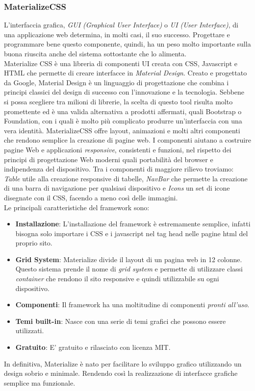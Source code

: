 \subsubsection{MaterializeCSS}
\label{sec:materialCSS}
L'interfaccia grafica, \textit{GUI (Graphical User Interface)} o \textit{UI (User Interface)}, di una applicazione web determina, in molti casi, il suo successo. Progettare e programmare bene questo componente, quindi, ha un peso molto importante sulla buona riuscita anche del sistema sottostante che lo alimenta. 
\\Materialize CSS è una libreria di componenti UI creata con CSS, Javascript e HTML che permette di creare interfacce in \textit{Material Design}. Creato e progettato da Google, Material Design è un linguaggio di progettazione che combina i principi classici del design di successo con l'innovazione e la tecnologia. Sebbene si possa scegliere tra milioni di librerie, la scelta di questo tool risulta molto promettente ed è una valida alternativa a prodotti affermati, quali Bootstrap o Foundation, con i quali è molto più complicato produrre un'interfaccia con una vera identità. MaterializeCSS offre layout, animazioni e molti altri componenti che rendono semplice la creazione di pagine web. I componenti aiutano a costruire pagine Web e applicazioni \textit{responsive}, consistenti e funzioni, nel rispetto dei principi di progettazione Web moderni quali portabilità del browser e indipendenza del dispositivo. Tra i componenti di maggiore rilievo troviamo: \textit{Table} utile alla creazione responsive di tabelle, \textit{NavBar} che permette la creazione di una barra di navigazione per qualsiasi dispositivo e \textit{Icons} un set di icone disegnate con il CSS, facendo a meno così delle immagini.
\\Le principali caratteristiche del framework sono:
\begin{itemize}
\item \textbf{Installazione}: L'installazione del framework è estremamente semplice, infatti bisogna solo importare i CSS e i javascript nel tag head nelle pagine html del proprio sito.
\item \textbf{Grid System}: Materialize divide il layout di un pagina web in 12 colonne. Questo sistema prende il nome di \textit{grid system} e permette di utilizzare classi \textit{container} che rendono il sito responsive e quindi utilizzabile su ogni dispositivo.
\item \textbf{Componenti}: Il framework ha una moltitudine di componenti \textit{pronti all'uso}.
\item \textbf{Temi built-in}: Nasce con una serie di temi grafici che possono essere utilizzati.
\item \textbf{Gratuito}: E' gratuito e rilasciato con licenza MIT.
\end{itemize} 
In definitiva, Materialize è nato per facilitare lo sviluppo grafico utilizzando un design sobrio e minimale. Rendendo così la realizzazione di interfacce grafiche semplice ma funzionale.


